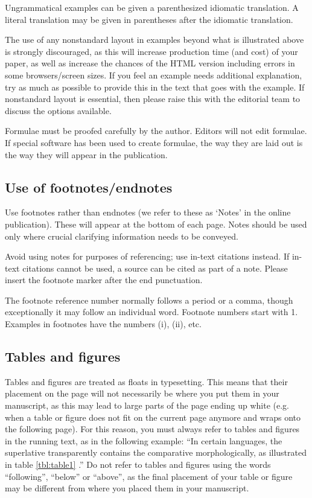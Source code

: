 \documentclass[charis,linguex]{glossa}
\begin{document}
Ungrammatical examples can be given a parenthesized idiomatic translation. A literal translation may be given in parentheses after the idiomatic translation.

The use of any nonstandard layout in examples beyond what is illustrated above is strongly discouraged, as this will increase production time (and cost) of your paper, as well as increase the chances of the HTML version including errors in some browsers/screen sizes. If you feel an example needs additional explanation, try as much as possible to provide this in the text that goes with the example. If nonstandard layout is essential, then please raise this with the editorial team to discuss the options available.

Formulae must be proofed carefully by the author. Editors will not edit formulae. If special software has been used to create formulae, the way they are laid out is the way they will appear in the publication.

\subsection{Use of footnotes/endnotes}\label{fn}

Use footnotes rather than endnotes (we refer to these as ‘Notes’ in the online publication). These will appear at the bottom of each page. Notes should be used only where crucial clarifying information needs to be conveyed. 

Avoid using notes for purposes of referencing; use in-text citations instead. If in-text citations cannot be used, a source can be cited as part of a note. Please insert the footnote marker after the end punctuation.

The footnote reference number normally follows a period or a comma, though exceptionally it may follow an individual word. Footnote numbers start with 1. Examples in footnotes have the numbers (i), (ii), etc.

\subsection{Tables and figures}

Tables and figures are treated as floats in typesetting. This means that their placement on the page will not necessarily be where you put them in your manuscript, as this may lead to large parts of the page ending up white (e.g. when a table or figure does not fit on the current page anymore and wraps onto the following page). For this reason, you must always refer to tables and figures in the running text, as in the following example: ``In certain languages, the superlative transparently contains the comparative morphologically, as illustrated in table \ref{tbl:table1} \citep[46]{Bobaljik2012}.'' Do not refer to tables and figures using the words ``following'', ``below'' or ``above'', as the final placement of your table or figure may be different from where you placed them in your manuscript.
\end{document}
